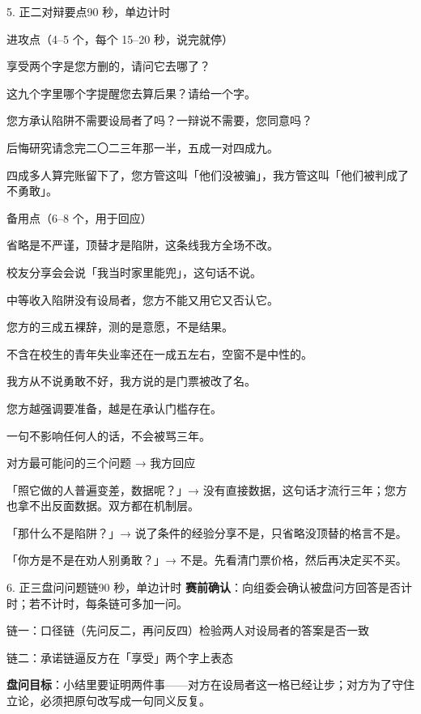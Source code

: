 \documentclass[script,pro]{debate}
\begin{document}
\begin{stage}{5. 正二对辩要点}{90 秒，单边计时}
\begin{points}{进攻点（4–5 个，每个 15–20 秒，说完就停）}
\item 享受两个字是您方删的，请问它去哪了？
\item 这九个字里哪个字提醒您去算后果？请给一个字。
\item 您方承认陷阱不需要设局者了吗？一辩说不需要，您同意吗？
\item 后悔研究请念完二〇二三年那一半，五成一对四成九。
\item 四成多人算完账留下了，您方管这叫「他们没被骗」，我方管这叫「他们被判成了不勇敢」。
\end{points}
\begin{points}{备用点（6–8 个，用于回应）}
\item 省略是不严谨，顶替才是陷阱，这条线我方全场不改。
\item 校友分享会会说「我当时家里能兜」，这句话不说。
\item 中等收入陷阱没有设局者，您方不能又用它又否认它。
\item 您方的三成五裸辞，测的是意愿，不是结果。
\item 不含在校生的青年失业率还在一成五左右，空窗不是中性的。
\item 我方从不说勇敢不好，我方说的是门票被改了名。
\item 您方越强调要准备，越是在承认门槛存在。
\item 一句不影响任何人的话，不会被骂三年。
\end{points}
\begin{points}{对方最可能问的三个问题 → 我方回应}
\item 「照它做的人普遍变差，数据呢？」→ 没有直接数据，这句话才流行三年；您方也拿不出反面数据。双方都在机制层。
\item 「那什么不是陷阱？」→ 说了条件的经验分享不是，只省略没顶替的格言不是。
\item 「你方是不是在劝人别勇敢？」→ 不是。先看清门票价格，然后再决定买不买。
\end{points}
\end{stage}

\begin{stage}{6. 正三盘问问题链}{90 秒，单边计时}
\textbf{赛前确认}：向组委会确认被盘问方回答是否计时；若不计时，每条链可多加一问。
\begin{chain}{链一：口径链（先问反二，再问反四）}{检验两人对设局者的答案是否一致}
\end{chain}
\begin{chain}{链二：承诺链}{逼反方在「享受」两个字上表态}
\end{chain}
\textbf{盘问目标}：小结里要证明两件事——对方在设局者这一格已经让步；对方为了守住立论，必须把原句改写成一句同义反复。
\end{stage}
\end{document}
